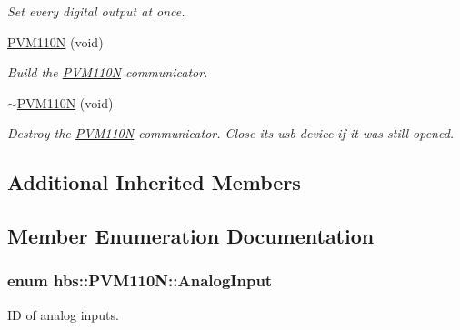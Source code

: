 \begin{DoxyCompactItemize}
\begin{DoxyCompactList}\small\item\em Set every digital output at once. \end{DoxyCompactList}\item 
\hyperlink{classhbs_1_1_p_v_m110_n_a15dec48a4afcb5b541072b971a0926dc}{P\-V\-M110\-N} (void)
\begin{DoxyCompactList}\small\item\em Build the \hyperlink{classhbs_1_1_p_v_m110_n}{P\-V\-M110\-N} communicator. \end{DoxyCompactList}\item 
\hyperlink{classhbs_1_1_p_v_m110_n_aff0c5265ddc42c42d1d1a97be46de4c8}{$\sim$\-P\-V\-M110\-N} (void)
\begin{DoxyCompactList}\small\item\em Destroy the \hyperlink{classhbs_1_1_p_v_m110_n}{P\-V\-M110\-N} communicator. Close its usb device if it was still opened. \end{DoxyCompactList}\end{DoxyCompactItemize}
\subsection*{Additional Inherited Members}


\subsection{Member Enumeration Documentation}
\hypertarget{classhbs_1_1_p_v_m110_n_ace5ddf4b54079516206c07f915c88d97}{
\subsubsection[{Analog\-Input}]{\setlength{\rightskip}{0pt plus 5cm}enum {\bf hbs\-::\-P\-V\-M110\-N\-::\-Analog\-Input}}}\label{classhbs_1_1_p_v_m110_n_ace5ddf4b54079516206c07f915c88d97}


I\-D of analog inputs. 

